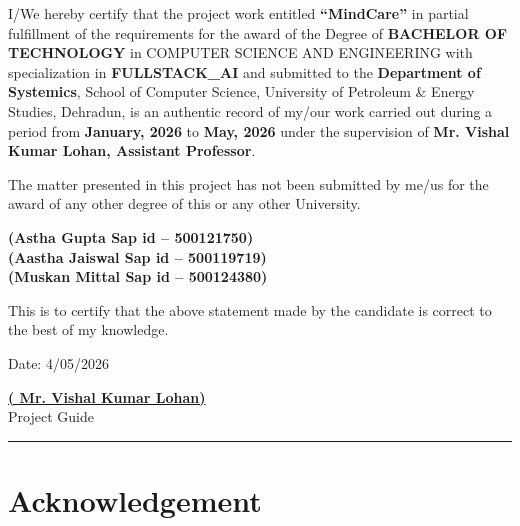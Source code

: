 \documentclass[a4paper,12pt]{report}
\begin{document}
\vspace{1cm}

I/We hereby certify that the project work entitled \textbf{``MindCare''} in partial fulfillment of the requirements for the award of the Degree of \textbf{BACHELOR OF TECHNOLOGY} in COMPUTER SCIENCE AND ENGINEERING with specialization in \textbf{FULLSTACK\_AI} and submitted to the \textbf{Department of Systemics}, School of Computer Science, University of Petroleum \& Energy Studies, Dehradun, is an authentic record of my/our work carried out during a period from \textbf{January, 2026} to \textbf{May, 2026} under the supervision of \textbf{Mr. Vishal Kumar Lohan, Assistant Professor}.

\vspace{0.5cm}

The matter presented in this project has not been submitted by me/us for the award of any other degree of this or any other University.

\vspace{1.5cm}

\begin{flushright}
    \textbf{(Astha Gupta \quad Sap id -- 500121750)} \\
    \textbf{(Aastha Jaiswal \quad Sap id -- 500119719)} \\
    \textbf{(Muskan Mittal \quad Sap id -- 500124380)}
\end{flushright}

\vspace{1.5cm}

This is to certify that the above statement made by the candidate is correct to the best of my knowledge.

\vspace{3cm}

\noindent
Date: 4/05/2026
\hfill
\begin{minipage}{5cm}
    \centering
    \textbf{\underline{( Mr. Vishal Kumar Lohan)}}\\
    Project Guide
\end{minipage}

\vfill
\hrule

\pagebreak
\chapter*{\centering Acknowledgement}
\end{document}
